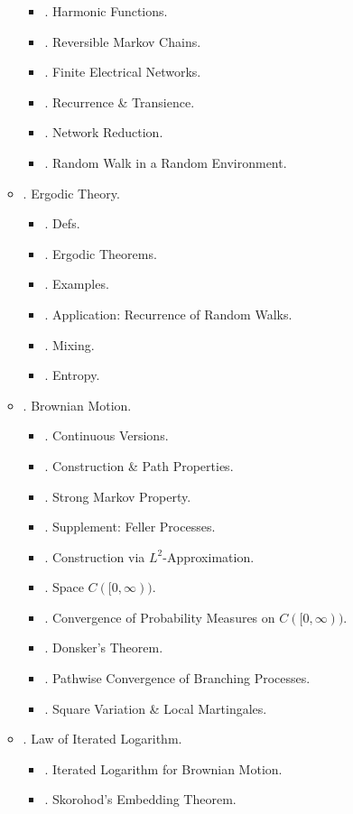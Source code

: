 \documentclass{article}
\begin{document}
\begin{enumerate}
\begin{itemize}
\begin{itemize}
			\item {. Harmonic Functions.}
			\item {. Reversible Markov Chains.}
			\item {. Finite Electrical Networks.}
			\item {. Recurrence \& Transience.}
			\item {. Network Reduction.}
			\item {. Random Walk in a Random Environment.}
		\end{itemize}
		\item {. Ergodic Theory.}
		\begin{itemize}
			\item {. Defs.}
			\item {. Ergodic Theorems.}
			\item {. Examples.}
			\item {. Application: Recurrence of Random Walks.}
			\item {. Mixing.}
			\item {. Entropy.}
		\end{itemize}
		\item {. Brownian Motion.}
		\begin{itemize}
			\item {. Continuous Versions.}
			\item {. Construction \& Path Properties.}
			\item {. Strong Markov Property.}
			\item {. Supplement: Feller Processes.}
			\item {. Construction via $L^2$-Approximation.}
			\item {. Space $C([0,\infty))$.}
			\item {. Convergence of Probability Measures on $C([0,\infty))$.}
			\item {. Donsker's Theorem.}
			\item {. Pathwise Convergence of Branching Processes.}
			\item {. Square Variation \& Local Martingales.}
		\end{itemize}
		\item {. Law of Iterated Logarithm.}
		\begin{itemize}
			\item {. Iterated Logarithm for Brownian Motion.}
			\item {. Skorohod's Embedding Theorem.}

\end{itemize}
\end{itemize}
\end{enumerate}
\end{document}
